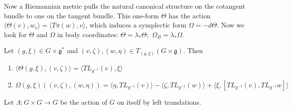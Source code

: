 Now a Riemannian metric pulls the natural canonical structure on the cotangent bundle to one on the tangent bundle. This one-form $\Theta$ has the action $ \langle \Theta(v), w_v \rangle = \langle T\pi(w), v \rangle$, which induces a symplectic form $\Omega = - d\Theta$. Now we look for $\Theta$ and $\Omega$ in body coordinates: $\Theta = \lambda_*\Theta; \hspace{4pt} \Omega_B = \lambda_*\Omega$.

\begin{prop}

Let $(g,\xi) \in G \times \mathfrak{g}^*$ and $(v,\zeta),(w,\eta) \in T_{(g,\xi)}(G \times \mathfrak{g})$. Then 
\begin{enumerate}
    \item $\langle \Theta(g,\xi), (v,\zeta) \rangle = \langle TL_{g^{-1}}(v), \xi \rangle$
    \item $\Omega(g,\xi)((v,\zeta),(w,\eta)) = \langle \eta, TL_{g^{-1}}(v) \rangle - \langle \zeta, TL_{g^{-1}}(w) \rangle + \langle \xi, [TL_{g^{-1}}(v), TL_{g^{-1}}w] \rangle $
\end{enumerate}

\end{prop}

Let $\Lambda: G \times G \to G$ be the action of $G$ on itself by left translations.

